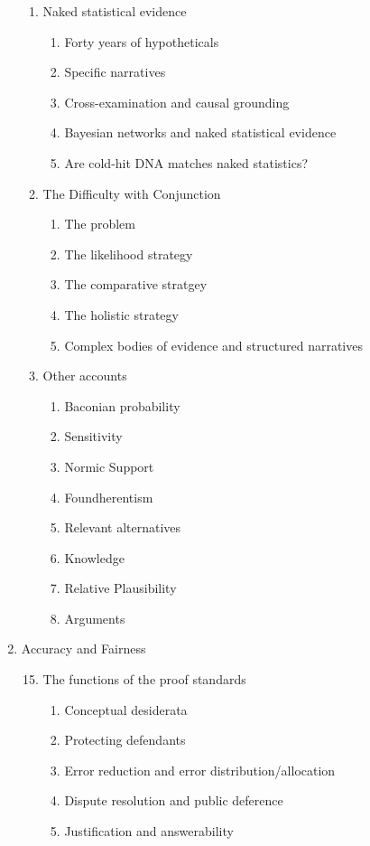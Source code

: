 \documentclass[10pt,dvipsnames,enabledeprecatedfontcommands]{scrartcl}
\begin{document}
\begin{enumerate}
\begin{enumerate}
\item  Naked statistical evidence
  \begin{enumerate}
  \item  Forty years of hypotheticals
  \item  Specific narratives
  \item  Cross-examination and causal grounding
  \item  Bayesian networks and naked statistical evidence
  \item  Are cold-hit DNA matches naked statistics?
  \end{enumerate}
  
  
\item  The Difficulty with Conjunction
  \begin{enumerate}
  \item  The problem
  \item  The likelihood strategy
  \item  The comparative stratgey
  \item  The holistic strategy
  \item  Complex bodies of evidence and structured narratives
  \end{enumerate}  

 \item  Other accounts 
  \begin{enumerate}
  \item  Baconian probability
  \item  Sensitivity
  \item  Normic Support
  \item  Foundherentism
  \item  Relevant alternatives
  \item  Knowledge
  \item  Relative Plausibility
  \item  Arguments
  \end{enumerate}

\end{enumerate}
\item  Accuracy and Fairness
\begin{enumerate}

\setcounter{enumii}{14}
  \item  The functions of the proof standards
  \begin{enumerate}
  \item  Conceptual desiderata
  \item  Protecting defendants
  \item  Error reduction and error distribution/allocation
  \item  Dispute resolution and public deference
  \item  Justification and answerability
  \end{enumerate}





\end{enumerate}
\end{enumerate}
\end{document}
